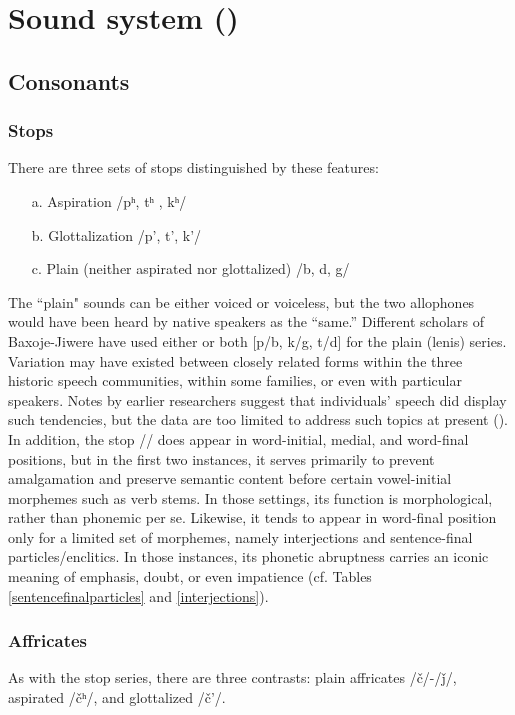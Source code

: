 \documentclass[output=paper]{LSP/langsci}
\begin{document}
\section {Sound system ()}	
		
\subsection{Consonants} 		     	                     	
\subsubsection{Stops} There are three sets of stops distinguished by these features: 	     
\begin{itemize}
\item[a.] Aspiration  /pʰ, tʰ , kʰ/
\item[b.] Glottalization /p', t', k'/
\item[c.] Plain (neither aspirated nor glottalized) /b, d, g/	
\end{itemize}   		         		
The ``plain" sounds can be either voiced or voiceless, but the two allophones would have been heard by native speakers as the ``same.''  Different scholars of Baxoje-Jiwere have used either or both [p/b, k/g, t/d] for the plain (lenis) series. Variation may have existed between closely related forms within the three historic speech communities, within some families, or even with particular speakers.  Notes by earlier researchers suggest that individuals' speech did display such tendencies, but the data are too limited to address such topics at present (\citealt{Whitman1947}). In addition, the  stop // does appear in word-initial, medial, and word-final positions, but in the first two instances, it serves primarily to prevent amalgamation and preserve semantic content before certain vowel-initial morphemes such as verb stems.  In those settings, its function is morphological, rather than phonemic per se. Likewise, it tends to appear in word-final position only for a limited set of morphemes, namely interjections and sentence-final particles/enclitics.  In those instances, its phonetic abruptness carries an iconic meaning of emphasis, doubt, or even impatience (cf. Tables \ref{sentencefinalparticles} and \ref{interjections}). 

\subsubsection{Affricates}  As with the stop series, there are three contrasts:  plain affricates /\v{c}/-/\v{j}/, aspirated /\v{c}ʰ/,  and glottalized /\v{c}'/. 
\end{document}
